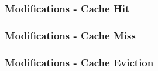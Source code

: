 \documentclass{beamer}
\begin{document}
\begin{frame}
  \frametitle{Modifications - Cache Hit}

  \begin{adjustbox}{width=\textwidth,height=0.42\textheight,keepaspectratio}
    
  \end{adjustbox}

\end{frame}

\begin{frame}
  \frametitle{Modifications - Cache Miss}

  \begin{adjustbox}{width=\textwidth,keepaspectratio}
    
  \end{adjustbox}

\end{frame}

\begin{frame}
  \frametitle{Modifications - Cache Eviction}

  \begin{adjustbox}{width=\textwidth,keepaspectratio}
    
  \end{adjustbox}

\end{frame}
\end{document}
